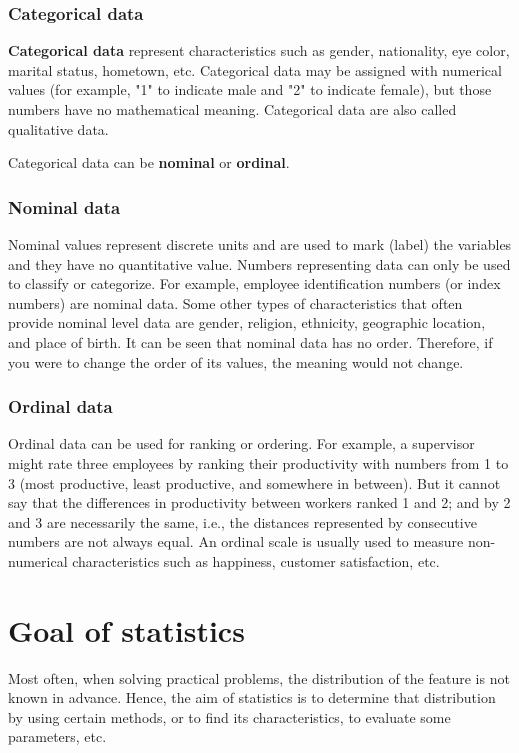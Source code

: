\documentclass[a4paper, 12pt]{article}
\begin{document}
\subsubsection{Categorical data}

\textbf{Categorical data} represent characteristics such as gender, nationality, eye color, marital status, hometown, etc. Categorical data may be assigned with numerical values (for example, "1" to indicate male and "2" to indicate female), but those numbers have no mathematical meaning. Categorical data are also called qualitative data.

Categorical data can be \textbf{nominal} or \textbf{ordinal}.

\subsubsection{Nominal data}
Nominal values represent discrete units and are used to mark (label) the variables and
they have no quantitative value. Numbers representing data can only be used to classify or categorize. For example, employee identification numbers (or index numbers) are nominal data. Some other types of characteristics that often provide nominal level data are gender, religion, ethnicity, geographic location, and place of birth. It can be seen that nominal data has no order. Therefore, if you were to change the order of its values, the meaning would not change.

\subsubsection{Ordinal data}

Ordinal data can be used for ranking or ordering. For example, a supervisor might rate
three employees by ranking their productivity with numbers from 1 to 3 (most
productive, least productive, and somewhere in between). But it cannot say that the
differences in productivity between workers ranked 1 and 2; and by 2 and 3 are
necessarily the same, i.e., the distances represented by consecutive numbers are not
always equal. An ordinal scale is usually used to measure non-numerical characteristics such as happiness, customer satisfaction, etc.


\section{Goal of statistics}

Most often, when solving practical problems, the distribution of the feature is not known in advance. Hence, the aim of statistics is to determine that distribution by using certain methods, or to find its characteristics, to evaluate some parameters, etc.
\end{document}
